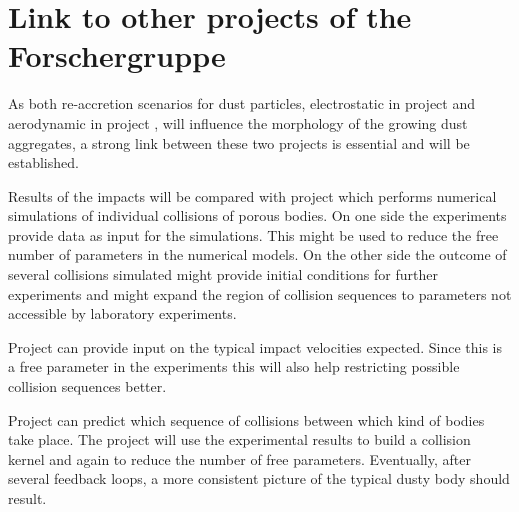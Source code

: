 \section{Link to other projects of the Forschergruppe}
\begin{linkproj}
\item[\projblum{}] As both re-accretion scenarios for dust
particles, electrostatic in project \projblum{} and aerodynamic in
project \projwurm{}, will influence the morphology of the growing
dust aggregates, a strong link between these two projects is
essential and will be established.

\item[\projkley{}] Results of the impacts will be compared with project
\projkley{} which performs numerical simulations of individual collisions of
porous bodies. On one side the experiments provide data as input for the
simulations. This might be used to reduce the free number of parameters in the
numerical models. On the other side the outcome of several collisions simulated
might provide initial conditions for further experiments and might expand
the region of collision sequences to parameters not accessible by laboratory
experiments.

\item[\projklahr{}] Project \projklahr{} can provide input on the typical
impact velocities expected. Since this is a free parameter in the experiments this
will also help restricting possible collision sequences better.
\item[\projdul{}] Project \projdul{} can predict which sequence of collisions
between which kind of bodies take place. The project will use the experimental results
to build a collision kernel and again to reduce the number of free parameters.
Eventually, after several feedback
loops, a more consistent picture of the typical dusty body should result.
\end{linkproj}



